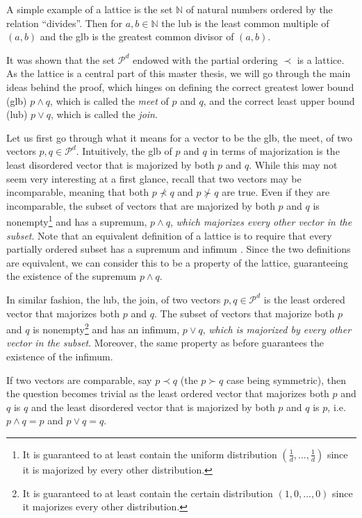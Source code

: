 A simple example of a lattice is the set $\mathbb{N}$ of natural numbers ordered by the relation “divides”. Then for $a, b \in \mathbb{N}$ the lub is the least common multiple of $(a, b)$ and the glb is the greatest common divisor of $(a, b)$. %

It was shown that the set $\mathcal{P}^d$ endowed with the partial ordering $\prec$ is a lattice. As the lattice is a central part of this master thesis, we will go through the main ideas behind the proof, which hinges on defining the correct greatest lower bound (glb) $p \wedge q$, which is called the \textit{meet} of $p$ and $q$, and the correct least upper bound (lub) $p \vee q$, which is called the \textit{join}.

Let us first go through what it means for a vector to be the glb, the meet, of two vectors $p, q \in \mathcal{P}^d$. Intuitively, the glb of $p$ and $q$ in terms of majorization is the least disordered vector that is majorized by both $p$ and $q$. While this may not seem very interesting at a first glance, recall that two vectors may be incomparable, meaning that both $p \nprec q$ and $p \nsucc q$ are true. Even if they are incomparable, the subset of vectors that are majorized by both $p$ and $q$ is nonempty\footnote{It is guaranteed to at least contain the uniform distribution $(\frac{1}{d}, ..., \frac{1}{d})$ since it is majorized by every other distribution.} and has a supremum, $p \wedge q$, \textit{which majorizes every other vector in the subset}. Note that an equivalent definition of a lattice is to require that every partially ordered subset has a supremum and infimum \cite[p. 19]{marshall_inequalities_2011}. Since the two definitions are equivalent, we can consider this to be a property of the lattice, guaranteeing the existence of the supremum $p \wedge q$.

In similar fashion, the lub, the join, of two vectors $p, q \in \mathcal{P}^d$ is the least ordered vector that majorizes both $p$ and $q$. The subset of vectors that majorize both $p$ and $q$ is nonempty\footnote{It is guaranteed to at least contain the certain distribution $(1, 0, ..., 0)$ since it majorizes every other distribution.} and has an infimum, $p \vee q$, \textit{which is majorized by every other vector in the subset}. Moreover, the same property as before guarantees the existence of the infimum.

\begin{corollary} \label{cor:comp_meet_join}
    If two vectors are comparable, say $p \prec q$ (the $p \succ q$ case being symmetric), then the question becomes trivial as the least ordered vector that majorizes both $p$ and $q$ is $q$ and the least disordered vector that is majorized by both $p$ and $q$ is $p$, i.e. $p \wedge q = p$ and $p \vee q = q$.
\end{corollary}




